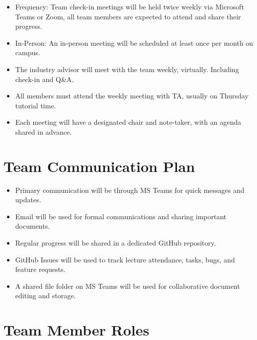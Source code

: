 \documentclass{article}
\begin{document}
\begin{itemize}
  \item Frequency: Team check-in meetings will be held twice weekly via Microsoft Teams or Zoom, all team members are expected to attend
  and share their progress.
  \item In-Person: An in-person meeting will be scheduled at least once per month on campus.
  \item The industry advisor will meet with the team weekly, virtually. Including check-in and Q\&A.
  \item All members must attend the weekly meeting with TA, usually on Thursday tutorial time.
  \item Each meeting will have a designated chair and note-taker, with an agenda shared in advance.
\end{itemize}

\section{Team Communication Plan}

\begin{itemize}
  \item Primary communication will be through MS Teams for quick messages and updates.
  \item Email will be used for formal communications and sharing important documents.
  \item Regular progress will be shared in a dedicated GitHub repository.
  \item GitHub Issues will be used to track lecture attendance, tasks, bugs, and feature requests.
  \item A shared file folder on MS Teams will be used for collaborative document editing and storage.
\end{itemize}

\section{Team Member Roles}

\end{document}
